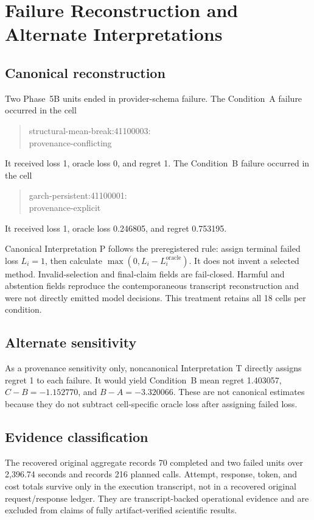 \section{Failure Reconstruction and Alternate Interpretations}
\label{supp:failures}

\subsection{Canonical reconstruction}

Two Phase~5B units ended in provider-schema failure.  The Condition~A failure
occurred in the cell
\begin{quote}
\ttfamily
structural-mean-break:41100003:\\
provenance-conflicting
\end{quote}
It received loss 1, oracle loss 0, and regret 1.  The Condition~B failure
occurred in the cell
\begin{quote}
\ttfamily
garch-persistent:41100001:\\
provenance-explicit
\end{quote}
It received loss 1, oracle loss 0.246805, and regret 0.753195.

Canonical Interpretation P follows the preregistered rule: assign terminal
failed loss \(L_i=1\), then calculate
\(\max(0,L_i-L_i^{\mathrm{oracle}})\).  It does not invent a selected method.
Invalid-selection and final-claim fields are fail-closed.  Harmful and
abstention fields reproduce the contemporaneous transcript reconstruction and
were not directly emitted model decisions.  This treatment retains all 18
cells per condition.

\subsection{Alternate sensitivity}

As a provenance sensitivity only, noncanonical Interpretation T directly
assigns regret 1 to each failure.  It would yield Condition~B mean regret
1.403057, \(C-B=-1.152770\), and \(B-A=-3.320066\).  These are not canonical
estimates because they do not subtract cell-specific oracle loss after
assigning failed loss.

\subsection{Evidence classification}

The recovered original aggregate records 70 completed and two failed units
over 2,396.74 seconds and records 216 planned calls.  Attempt, response, token,
and cost totals survive only in the execution transcript, not in a recovered
original request/response ledger.  They are transcript-backed operational
evidence and are excluded from claims of fully artifact-verified scientific
results.
